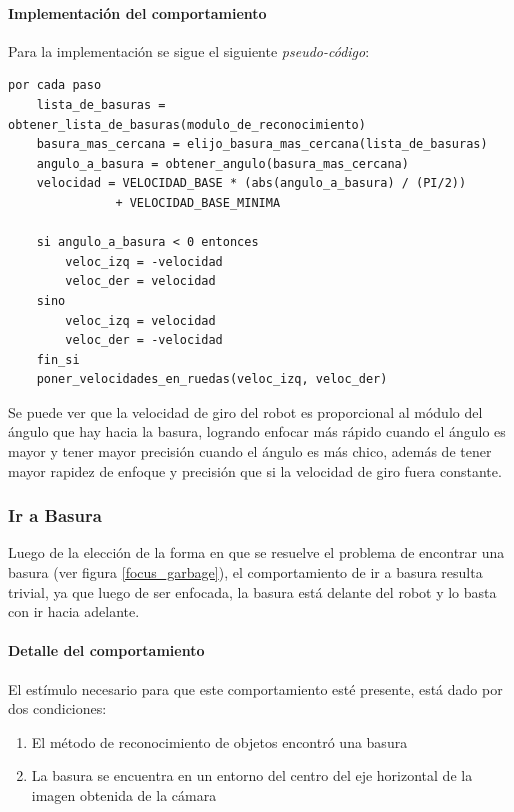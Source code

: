 \paragraph{Implementaci\'on del comportamiento}
\label{focus_garbage:impl}
Para la implementaci\'on se sigue el siguiente \emph{pseudo-c\'odigo}:
\begin{verbatim}
por cada paso
    lista_de_basuras = obtener_lista_de_basuras(modulo_de_reconocimiento)
    basura_mas_cercana = elijo_basura_mas_cercana(lista_de_basuras)
    angulo_a_basura = obtener_angulo(basura_mas_cercana)
    velocidad = VELOCIDAD_BASE * (abs(angulo_a_basura) / (PI/2))
               + VELOCIDAD_BASE_MINIMA

    si angulo_a_basura < 0 entonces
        veloc_izq = -velocidad
        veloc_der = velocidad
    sino
        veloc_izq = velocidad
        veloc_der = -velocidad
    fin_si
    poner_velocidades_en_ruedas(veloc_izq, veloc_der)
\end{verbatim}

Se puede ver que la velocidad de giro del robot es proporcional al m\'odulo del
\'angulo que hay hacia la basura, logrando enfocar m\'as r\'apido cuando el
\'angulo es mayor y tener mayor precisi\'on cuando el \'angulo es m\'as chico,
adem\'as de tener mayor rapidez de enfoque y precisi\'on que si la velocidad de
giro fuera constante.
\\

\subsubsection{Ir a Basura}
\label{go_to_garbage}
Luego de la elecci\'on de la forma en que se resuelve el problema de encontrar
una basura (ver figura \ref{focus_garbage}), el comportamiento de ir a basura
resulta trivial, ya que luego de ser enfocada, la basura est\'a delante del
robot y lo basta con ir hacia adelante.

\paragraph{Detalle del comportamiento}
El est\'imulo necesario para que este comportamiento est\'e presente, est\'a
dado por dos condiciones:
\begin{enumerate}
\item El m\'etodo de reconocimiento de objetos encontr\'o una basura
\item La basura se encuentra en un entorno del centro del eje horizontal de la
		imagen obtenida de la c\'amara
\end{enumerate}

